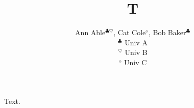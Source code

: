 \documentclass{article}
\title{T}
\author{Ann Able$^{\clubsuit \heartsuit}$, Cat Cole$^{\diamond}$, Bob Baker$^{\clubsuit}$ \\ $^{\clubsuit}$ Univ A \\
$^{\heartsuit}$ Univ B \\ $^{\diamond}$ Univ C}
\begin{document}
\maketitle
Text.
\end{document}
